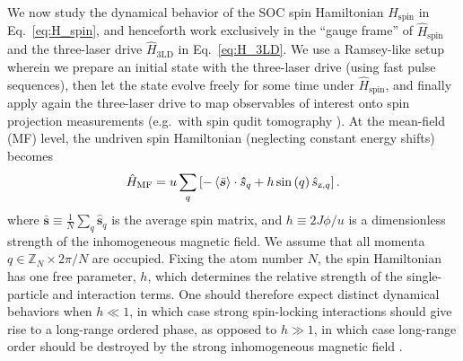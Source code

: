 \documentclass[aps,pra,nofootinbib,twocolumn,superscriptaddress]{revtex4-2}
\renewcommand{\t}{\text} %
\newcommand{\p}[1]{\left(#1\right)} %
\renewcommand{\sp}[1]{\left[#1\right]} %
\newcommand{\bk}{\braket} %
\newcommand{\1}{\mathds{1}}
\newcommand{\s}{\hat{s}}
\renewcommand{\H}{\hat{H}}
\newcommand{\z}{\text{z}}
\newcommand{\ZZ}{\mathbb{Z}}
\newcommand{\spin}{\text{spin}}
\newcommand{\MF}{\text{MF}}
\begin{document}
We now study the dynamical behavior of the SOC spin Hamiltonian $H_\spin$ in Eq.~\eqref{eq:H_spin}, and henceforth work exclusively in the ``gauge frame'' of $\H_\spin$ and the three-laser drive $\H_{\t{3LD}}$ in Eq.~\eqref{eq:H_3LD}.
We use a Ramsey-like setup wherein we prepare an initial state with the three-laser drive (using fast pulse sequences), then let the state evolve freely for some time under $\H_\spin$, and finally apply again the three-laser drive to map observables of interest onto spin projection measurements (e.g.~with spin qudit tomography \cite{newton1968measurability, perlin2021spin}).
At the mean-field (MF) level, the undriven spin Hamiltonian (neglecting constant energy shifts) becomes
\begin{align}
  \H_\MF = u \sum_q\sp{-\bk{\bar{\bm{s}}}\cdot\bm\s_q
    + h \sin\p{q} \s_{\z,q}}.
  \label{eq:H_MF}
\end{align}
where $\bar{\bm{s}}\equiv\frac1N\sum_q\bm\s_q$ is the average spin matrix, and $h\equiv 2J\phi/u$ is a dimensionless strength of the inhomogeneous magnetic field.
We assume that all momenta $q\in\ZZ_N\times 2\pi/N$ are occupied.
Fixing the atom number $N$, the spin Hamiltonian has one free parameter, $h$, which determines the relative strength of the single-particle and interaction terms.
One should therefore expect distinct dynamical behaviors when $h\ll1$, in which case strong spin-locking interactions should give rise to a long-range ordered phase, as opposed to $h\gg1$, in which case long-range order should be destroyed by the strong inhomogeneous magnetic field \cite{smale2019observation}.
\end{document}
